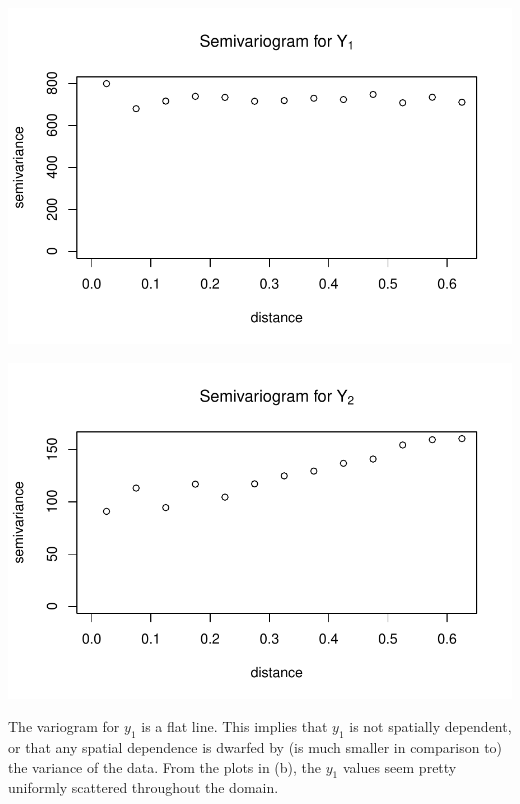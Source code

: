 \documentclass[letterpaper, 12pt]{article}\usepackage[]{graphicx}\usepackage[]{color}
\makeatletter
\def\maxwidth{ %
  \ifdim\Gin@nat@width>\linewidth
    \linewidth
  \else
    \Gin@nat@width
  \fi
}
\newenvironment{knitrout}{}{} %
\makeatother
\begin{document}
\begin{enumerate}[(a)]
\begin{knitrout}
\color{fgcolor}
\includegraphics[width=\maxwidth]{figure/unnamed-chunk-1} 

\end{knitrout}

\begin{knitrout}
\color{fgcolor}
\includegraphics[width=\maxwidth]{figure/unnamed-chunk-2} 

\end{knitrout}


{\sf
The variogram for $y_1$ is a flat line. This implies that $y_1$ is not spatially dependent, or that any spatial dependence is dwarfed by (is much smaller in comparison to) the variance of the data. From the plots in (b), the $y_1$ values seem pretty uniformly scattered throughout the domain.
 
}
\end{enumerate}
\end{document}
